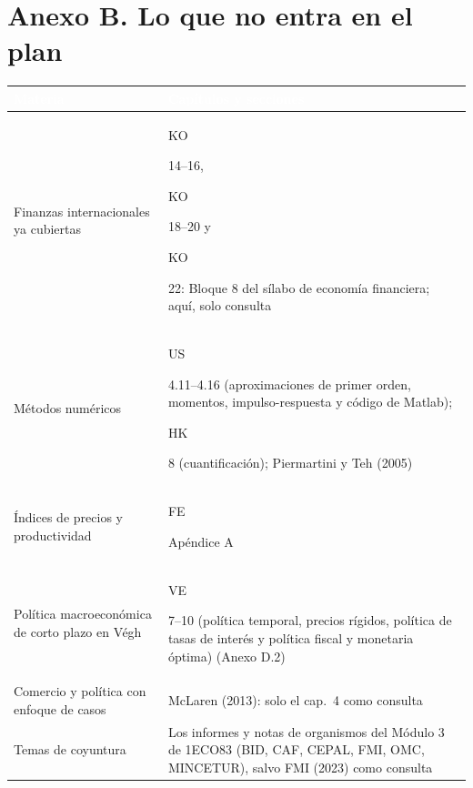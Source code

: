 \documentclass[11pt,a4paper]{article}
\newcommand{\cab}[1]{\textcolor{white}{\sffamily\bfseries #1}}
\newcommand{\filasalternas}{\rowcolors{2}{white}{tonoPalido}}
\newcommand{\etiqueta}[2]{%
  {\setlength{\fboxsep}{1.4pt}\colorbox{#1}{\sffamily\bfseries\color{white}\strut#2}}}
\newcommand{\FE}[1]{\etiqueta{colorFE}{FE}\nobreak\hspace{0.25em}\textcolor{colorFE}{#1}}
\newcommand{\KO}[1]{\etiqueta{colorKO}{KO}\nobreak\hspace{0.25em}\textcolor{colorKO}{#1}}
\newcommand{\HK}[1]{\etiqueta{colorHK}{HK}\nobreak\hspace{0.25em}\textcolor{colorHK}{#1}}
\newcommand{\US}[1]{\etiqueta{colorUS}{US}\nobreak\hspace{0.25em}\textcolor{colorUS}{#1}}
\newcommand{\VE}[1]{\etiqueta{colorVE}{VE}\nobreak\hspace{0.25em}\textcolor{colorVE}{#1}}
\begin{document}


\section*{Anexo B. Lo que no entra en el plan}

{\small\filasalternas
\noindent\begin{tabularx}{\textwidth}{>{\raggedright\arraybackslash}p{4.6cm}X}
\toprule
\rowcolor{tonoOscuro}\cab{Materia} & \cab{Capítulos y secciones} \\
\midrule
Finanzas internacionales ya cubiertas & \KO{14--16}, \KO{18--20} y \KO{22}: Bloque 8 del sílabo de economía financiera; aquí, solo consulta \\
Métodos numéricos & \US{4.11--4.16} (aproximaciones de primer orden, momentos, impulso-respuesta y código de Matlab); \HK{8} (cuantificación); Piermartini y Teh (2005) \\
Índices de precios y productividad & \FE{Apéndice A} \\
Política macroeconómica de corto plazo en Végh & \VE{7--10} (política temporal, precios rígidos, política de tasas de interés y política fiscal y monetaria óptima) (Anexo D.2) \\
Comercio y política con enfoque de casos & McLaren (2013): solo el cap.~4 como consulta \\
Temas de coyuntura & Los informes y notas de organismos del Módulo 3 de 1ECO83 (BID, CAF, CEPAL, FMI, OMC, MINCETUR), salvo FMI (2023) como consulta \\
\bottomrule
\end{tabularx}
}
\end{document}
